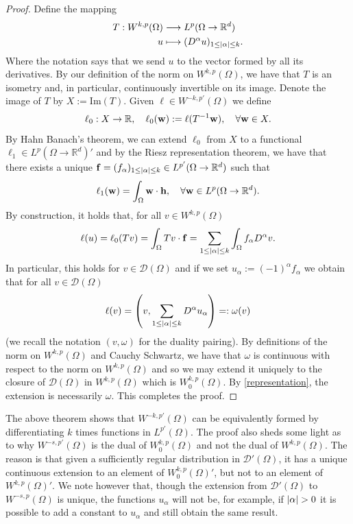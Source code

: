 \documentclass[
    a4paper,
    DIV=14,
    abstract=true,
    numbers=noenddot
]
{scrartcl}
\theoremstyle{definition}
\newcommand{\rm}[1]{\mathrm{#1}}
\newcommand{\R}{\mathbb{R}}
\newcommand{\Dd}{\mathcal{D}}
\begin{document}
\begin{proof}
    Define the mapping
    \begin{align*}
        T: W^{k,p}(\Omega ) & \longrightarrow L^p(\Omega \to \R^d)                \\
        u                   & \longmapsto(D^\alpha u)_{1 \leq\abs{\alpha}\leq k}.
    \end{align*}
    Where the notation says that we send $u$ to the vector formed by all its derivatives. By our definition of the norm on $W^{k,p}(\Omega )$, we have that $T$ is an isometry and, in particular, continuously invertible on its image. Denote the image of $T$ by $X:=\rm{Im}(T)$. Given $\ell \in W^{-k,p'}(\Omega )$ we define
    \begin{align*}
        \ell_0: X \to \R, \quad \ell_0(\vb{w}):= \ell(T^{-1}\vb{w}), \quad \forall \vb{w} \in X.
    \end{align*}
    By Hahn Banach's theorem, we can extend $\ell_0$ from $X$ to a functional $\ell_1 \in  L^p(\Omega \to \R^d)'$ and by the Riesz representation theorem, we have that there exists a unique $\vb{f}=(f_\alpha)_{1\leq \abs{\alpha}\leq k }\in L^{p'}(\Omega \to \R^d)$ such that
    \begin{align*}
        \ell_1(\vb{w})=\int_{\Omega}\vb{w}\cdot \vb{h}, \quad \forall \vb{w} \in L^p(\Omega \to \R^d).
    \end{align*}
    By construction, it holds that, for all $v \in W^{k,p}(\Omega )$
    \begin{align*}
        \ell(u)=\ell_0(Tv)=\int_{\Omega}Tv\cdot \vb{f}=\sum_{1\leq\left| \alpha \right|\leq k}\int_{\Omega}f_\alpha D^\alpha v .
    \end{align*}
    In particular, this holds for $v \in \Dd(\Omega )$ and if we set $u_\alpha:=(-1)^\alpha f_\alpha$ we obtain that for all $v \in \Dd(\Omega )$
    \begin{align}\label{representation}
        \ell(v)=\left(v,\sum_{1\leq\left| \alpha \right|\leq k} D^\alpha u_\alpha\right)=: \omega(v)
    \end{align}
    (we recall the notation $(v,\omega)$ for the duality pairing). By definitions of the norm on $W^{k,p}(\Omega )$ and Cauchy Schwartz, we have that $\omega$ is continuous with respect to the norm on $W^{k,p}(\Omega )$ and so we may extend it uniquely to the closure of $\Dd(\Omega )$ in $W^{k,p}(\Omega )$ which is $W^{k,p}_0(\Omega )$. By \eqref{representation}, the extension is necessarily $\omega$. This completes the proof.
\end{proof}
The above theorem shows that $W^{-k,p'}(\Omega )$ can be equivalently formed by differentiating $k$ times functions in $L^{p'}(\Omega )$. The proof also sheds some light as to why $W^{-s,p'}(\Omega )$ is the dual of $W^{k,p}_0(\Omega )$ and not the dual of $W^{k,p}(\Omega )$. The reason is that given a sufficiently regular distribution in $\Dd'(\Omega )$, it has a unique continuous extension to an element of $W_0^{k,p}(\Omega )'$, but not to an element of $W^{k,p}(\Omega )'$. We note however that, though the extension from $\Dd'(\Omega )$ to $W^{-s,p}(\Omega )$ is unique, the functions $u_\alpha$ will not be, for example, if $\abs{\alpha}>0$ it is possible to add a constant to $u_\alpha$ and still obtain the same result.
\end{document}

